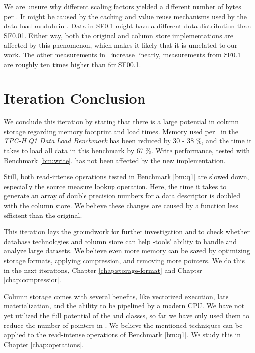 We are unsure why different scaling factors yielded a different number of bytes per \lineitem. It might be caused by the caching and value reuse mechanisms used by the data load module in \gap. Data in SF0.1 might have a different data distribution than SF0.01. Either way, both the original and column store implementations are affected by this phenomenon, which makes it likely that it is unrelated to our work. The other measurements in \tpchdl~increase linearly, measurements from SF0.1 are roughly ten times higher than for SF00.1. 

\section{Iteration Conclusion}
\label{sec:Iteration Conclusion}
We conclude this iteration by stating that there is a large potential in column storage regarding memory footprint and load times. Memory used per \lineitem~in the \textit{TPC-H Q1 Data Load Benchmark} has been reduced by 30 - 38 \%, and the time it takes to load all data in this benchmark by 67 \%. Write performance, tested with Benchmark \ref{bm:write}, has not been affected by the new implementation.

Still, both read-intense operations tested in Benchmark \ref{bm:q1} are slowed down, especially the source measure lookup operation. Here, the time it takes to generate an array of double precision numbers for a data descriptor is doubled with the column store. We believe these changes are caused by a  function less efficient than the original.

This iteration lays the groundwork for further investigation and to check whether database technologies and column store can help \mdd-tools' ability to handle and analyze large datasets. We believe even more memory can be saved by optimizing storage formats, applying compression, and removing more pointers. We do this in the next iterations, Chapter \ref{chap:storage-format} and Chapter \ref{chap:compression}. 

Column storage comes with several benefits, like vectorized execution, late materialization, and the ability to be pipelined by a modern CPU. We have not yet utilized the full potential of the  and  classes, so far we have only used them to reduce the number of pointers in \gap. We believe the mentioned techniques can be applied to the read-intense operations of Benchmark \ref{bm:q1}. We study this in Chapter \ref{chap:operations}.

